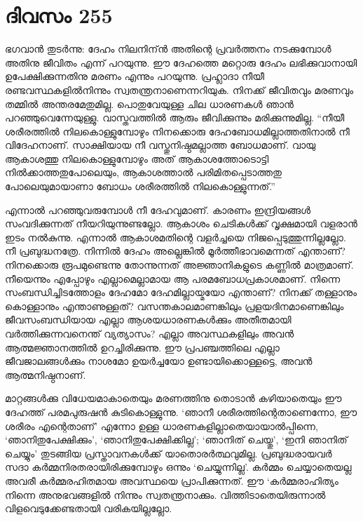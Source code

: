 \section{ദിവസം 255}


ഭഗവാന്‍ തുടര്‍ന്നു: ദേഹം നിലനിന്ന്‍  അതിന്റെ പ്രവര്‍ത്തനം നടക്കുമ്പോള്‍ അതിനു ജീവിതം എന്ന് പറയുന്നു. ഈ ദേഹത്തെ മറ്റൊരു ദേഹം ലഭിക്കുവാനായി ഉപേക്ഷിക്കുന്നതിനു മരണം എന്നും പറയുന്നു. പ്രഹ്ലാദാ നീയീ രണ്ടവസ്ഥകളില്‍നിന്നും സ്വതന്ത്രനാണെന്നറിയുക. നിനക്ക് ജീവിതവും മരണവും തമ്മില്‍ അന്തരമേതുമില്ല. പൊതുവേയുള്ള ചില ധാരണകള്‍ ഞാന്‍ പറഞ്ഞുവെന്നേയുള്ളു. വാസ്തവത്തില്‍ ആരും ജീവിക്കുന്നും മരിക്കുന്നുമില്ല. “നീയീ ശരീരത്തില്‍ നിലകൊള്ളുമ്പോഴും നിനക്കൊരു ദേഹബോധമില്ലാത്തതിനാല്‍ നീ വിദേഹനാണ്. സാക്ഷിയായ നീ വസ്തുനിഷ്ഠമല്ലാത്ത ബോധമാണ്. വായു ആകാശത്തു നിലകൊള്ളുമ്പോഴും അത് ആകാശത്തോടൊട്ടി നില്‍ക്കാത്തതുപോലെയും, ആകാശത്താല്‍ പരിമിതപ്പെടാത്തതു പോലെയുമായാണാ ബോധം ശരീരത്തില്‍ നിലകൊള്ളുന്നത്.”      

എന്നാല്‍ പറഞ്ഞുവരുമ്പോള്‍ നീ ദേഹവുമാണ്. കാരണം ഇന്ദ്രിയങ്ങള്‍ സംവദിക്കുന്നത് നീയറിയുന്നുണ്ടല്ലോ. ആകാശം ചെടികള്‍ക്ക് വൃക്ഷമായി വളരാന്‍ ഇടം നല്‍കുന്നു. എന്നാല്‍ ആകാശമതിന്റെ വളര്‍ച്ചയെ നിജപ്പെടുത്തുന്നില്ലല്ലോ. നീ പ്രബുദ്ധനത്രേ. നിന്നില്‍ ദേഹം അല്ലെങ്കില്‍ മൂര്‍ത്തീഭാവമെന്നത് എന്താണ്? നിനക്കൊരു രൂപമുണ്ടെന്നു തോന്നുന്നത് അജ്ഞാനികളുടെ കണ്ണില്‍ മാത്രമാണ്. നീയെന്നും എപ്പോഴും എല്ലാമെല്ലാമായ ആ  പരമബോധപ്രകാശമാണ്. നിന്നെ സംബന്ധിച്ചിടത്തോളം ദേഹമോ ദേഹമില്ലായ്മയോ എന്താണ്? നിനക്ക് തള്ളാനും കൊള്ളാനും എന്താണുള്ളത്? വസന്തകാലമാണങ്കിലും  പ്രളയദിനമാണെങ്കിലും ജീവസംബന്ധിയായ എല്ലാ ആശയധാരണകള്‍ക്കും അതീതമായി വര്‍ത്തിക്കുന്നവനെന്ത് വ്യത്യാസം? എല്ലാ അവസ്ഥകളിലും അവന്‍ ആത്മജ്ഞാനത്തില്‍ ഉറച്ചിരിക്കുന്നു. ഈ പ്രപഞ്ചത്തിലെ എല്ലാ ജീവജാലങ്ങള്‍ക്കും നാശമോ ഉയര്‍ച്ചയോ ഉണ്ടായിക്കൊള്ളട്ടെ, അവന്‍ ആത്മനിഷ്ഠനാണ്.

മാറ്റങ്ങള്‍ക്കു വിധേയമാകാതെയും മരണത്തിനു തൊടാന്‍ കഴിയാതെയും ഈ  ദേഹത്ത് പരമപുരുഷന്‍ കുടികൊള്ളുന്നു. ‘ഞാനീ ശരീരത്തിന്റെതാണെന്നോ, ഈ ശരീരം എന്റെതാണ്’ എന്നോ ഉള്ള ധാരണകളില്ലാതെയായാല്‍പ്പിന്നെ, ‘ഞാനിതുപേക്ഷിക്കും’, ‘ഞാനിതുപേക്ഷിക്കില്ല’; ‘ഞാനിത് ചെയ്തു’, ‘ഇനി ഞാനിത് ചെയ്യും’ തുടങ്ങിയ പ്രസ്താവനകള്‍ക്ക് യാതൊരര്‍ത്ഥവുമില്ല. പ്രബുദ്ധരായവര്‍ സദാ കര്‍മ്മനിരതരായിരിക്കുമ്പോഴും ഒന്നും ‘ചെയ്യുന്നില്ല’. കര്‍മ്മം ചെയ്യാതെയല്ല അവരീ കര്‍മ്മരഹിതമായ അവസ്ഥയെ പ്രാപിക്കുന്നത്. ഈ ‘കര്‍മ്മരാഹിത്യം നിന്നെ അനുഭവങ്ങളില്‍ നിന്നും സ്വതന്ത്രനാക്കും. വിത്തിടാതെയിരുന്നാല്‍  വിളവെടുക്കേണ്ടതായി വരികയില്ലല്ലോ. 
     
